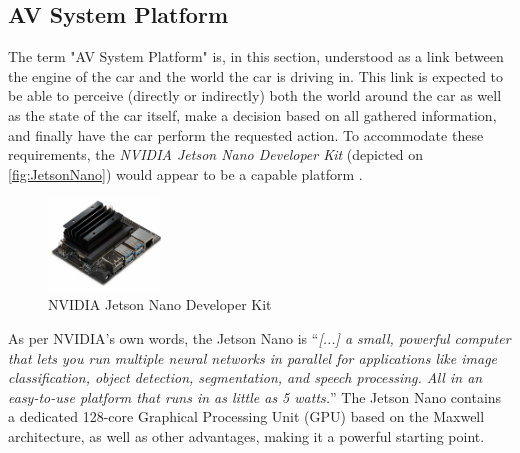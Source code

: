 \subsection{AV System Platform}\label{ssec:optimalHardwareAVPlatform}
The term "AV System Platform" is, in this section, understood as a link between the engine of the car and the world the car is driving in.
This link is expected to be able to perceive (directly or indirectly) both the world around the car as well as the state of the car itself, make a decision based on all gathered information, and finally have the car perform the requested action.
To accommodate these requirements, the \textit{NVIDIA Jetson Nano Developer Kit} (depicted on \autoref{fig:JetsonNano}) would appear to be a capable platform \cite{JetsonNano}.
\begin{figure}[H]
  \centering
  \includegraphics[width=3cm]{images/techAnalysis/JetsonNano.jpg}
  \caption{NVIDIA Jetson Nano Developer Kit}
  \label{fig:JetsonNano}
\end{figure}
As per NVIDIA's own words, the Jetson Nano is ``\textit{[...] a small, powerful computer that lets you run multiple neural networks in parallel for applications like image classification, object detection, segmentation, and speech processing. All in an easy-to-use platform that runs in as little as 5 watts.}''
The Jetson Nano contains a dedicated 128-core Graphical Processing Unit (GPU) based on the Maxwell architecture, as well as other advantages, making it a powerful starting point.
\cite{JetsonNano}

